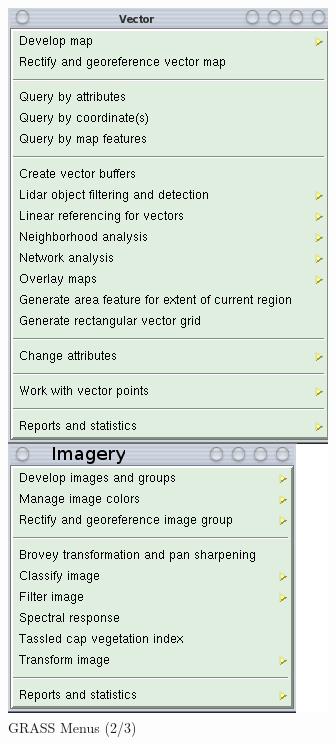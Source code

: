 \begin{figure}[htbp]
   \centering
   \includegraphics[scale=0.4]{grass026.png}
   \caption{GRASS Menus (2/3)}
   \label{fig:grass026}
\end{figure}

